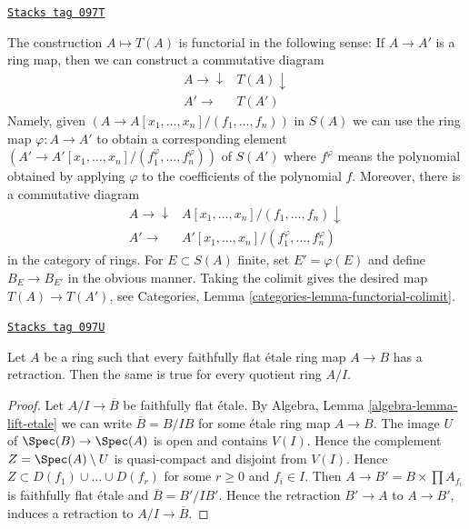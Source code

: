 \begin{remark}
\label{proetale-remark-first-construction-functorial}
\href{https://stacks.math.columbia.edu/tag/097T}{\texttt{Stacks tag 097T}}

The construction $A \mapsto T(A)$ is functorial in the following sense:
If $A \to A'$ is a ring map, then we can construct a commutative diagram
$$
\begin{array}{cc}A \longrightarrow\downarrow & T(A) \downarrow \\ A' \longrightarrow & T(A')\end{array}
$$
Namely, given $(A \to A[x_1, \ldots, x_n]/(f_1, \ldots, f_n))$ in
$S(A)$ we can use the ring map $\varphi : A \to A'$ to obtain a corresponding
element $(A' \to A'[x_1, \ldots, x_n]/(f^\varphi_1, \ldots, f^\varphi_n))$
of $S(A')$ where $f^\varphi$ means the polynomial obtained by applying
$\varphi$ to the coefficients of the polynomial $f$.
Moreover, there is a commutative diagram
$$
\begin{array}{cc}A \longrightarrow\downarrow & A[x_1, \ldots, x_n]/(f_1, \ldots, f_n) \downarrow \\ A' \longrightarrow & A'[x_1, \ldots, x_n]/(f^\varphi_1, \ldots, f^\varphi_n)\end{array}
$$
in the category of rings. For $E \subset S(A)$ finite, set
$E' = \varphi(E)$ and define $B_E \to B_{E'}$ in the obvious manner.
Taking the colimit gives the desired map $T(A) \to T(A')$, see
Categories, Lemma \ref{categories-lemma-functorial-colimit}.
\end{remark}

\begin{lemma}
\label{proetale-lemma-have-sections-quotient}
\href{https://stacks.math.columbia.edu/tag/097U}{\texttt{Stacks tag 097U}}

Let $A$ be a ring such that every faithfully flat \'etale ring map
$A \to B$ has a retraction. Then the same is true for every quotient ring
$A/I$.
\end{lemma}

\begin{proof}
Let $A/I \to \overline{B}$ be faithfully flat \'etale. By Algebra, Lemma
\ref{algebra-lemma-lift-etale} we can write $\overline{B} = B/IB$ for
some \'etale ring map $A \to B$. The image $U$ of $\Spec(B) \to \Spec(A)$
is open and contains $V(I)$. Hence the complement $Z = \Spec(A) \setminus U$
is quasi-compact and disjoint from $V(I)$. Hence
$Z \subset D(f_1) \cup \ldots \cup D(f_r)$ for some $r \geq 0$
and $f_i \in I$. Then $A \to B' = B \times \prod A_{f_i}$
is faithfully flat \'etale and $\overline{B} = B'/IB'$.
Hence the retraction $B' \to A$ to $A \to B'$, induces
a retraction to $A/I \to \overline{B}$.
\end{proof}

